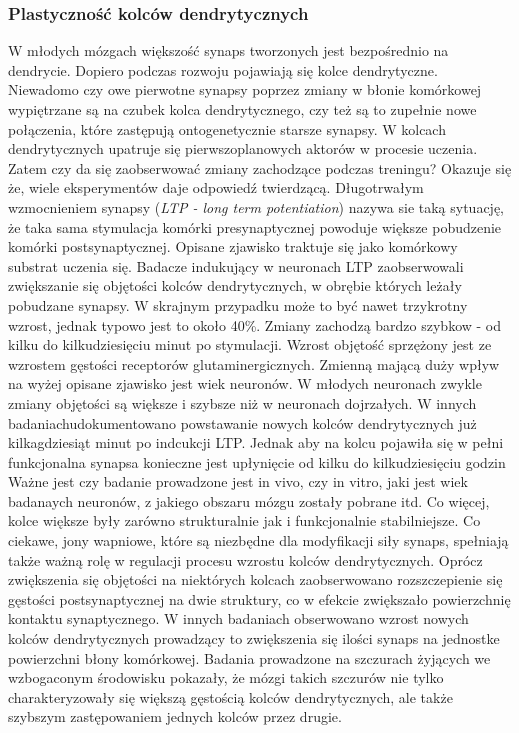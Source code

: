 \documentclass{article}
\begin{document}
\subsubsection{Plastyczność kolców dendrytycznych}
W młodych mózgach większość synaps tworzonych jest bezpośrednio na dendrycie.
Dopiero podczas rozwoju pojawiają się kolce dendrytyczne.
Niewadomo czy owe pierwotne synapsy poprzez zmiany w błonie komórkowej wypiętrzane są na czubek kolca dendrytycznego, czy też są to zupełnie nowe połączenia, które zastępują ontogenetycznie starsze synapsy.
W kolcach dendrytycznych upatruje się pierwszoplanowych aktorów w procesie uczenia.
Zatem czy da się zaobserwować zmiany zachodzące podczas treningu?
Okazuje się że, wiele eksperymentów daje odpowiedź twierdzącą.
Długotrwałym wzmocnieniem synapsy (\emph{LTP - long term potentiation}) nazywa sie taką sytuację, że taka sama stymulacja komórki presynaptycznej powoduje większe pobudzenie komórki postsynaptycznej.
Opisane zjawisko traktuje się jako komórkowy substrat uczenia się.
Badacze indukujący w neuronach LTP zaobserwowali zwiększanie się objętości kolców dendrytycznych, w obrębie których leżały pobudzane synapsy.
W skrajnym przypadku może to być nawet trzykrotny wzrost, jednak typowo jest to około 40\%.
Zmiany zachodzą bardzo szybkow - od kilku do kilkudziesięciu minut po stymulacji. 
Wzrost objętość sprzężony jest ze wzrostem gęstości receptorów glutaminergicznych.
Zmienną mającą duży wpływ na wyżej opisane zjawisko jest wiek neuronów.
W młodych neuronach zwykle zmiany objętości są większe i szybsze niż w neuronach dojrzałych.
W innych badaniachudokumentowano powstawanie nowych kolców dendrytycznych już kilkagdziesiąt minut po indcukcji LTP.
Jednak aby na kolcu pojawiła się w pełni funkcjonalna synapsa konieczne jest upłynięcie od kilku do kilkudziesięciu godzin\cite{Sala2014}
Ważne jest czy badanie prowadzone jest in vivo, czy in vitro, jaki jest wiek badanaych neuronów, z jakiego obszaru mózgu zostały pobrane itd.
Co więcej, kolce większe były zarówno strukturalnie jak i funkcjonalnie stabilniejsze.
Co ciekawe, jony wapniowe, które są niezbędne dla modyfikacji siły synaps, spełniają także ważną rolę w regulacji procesu wzrostu kolców dendrytycznych.
Oprócz zwiększenia się objętości na niektórych kolcach zaobserwowano rozszczepienie się gęstości postsynaptycznej na dwie struktury, co w efekcie zwiększało powierzchnię kontaktu synaptycznego.
W innych badaniach obserwowano wzrost nowych kolców dendrytycznych prowadzący to zwiększenia się ilości synaps na jednostke powierzchni błony komórkowej.
Badania prowadzone na szczurach żyjących we wzbogaconym środowisku pokazały, że mózgi takich szczurów nie tylko charakteryzowały się większą gęstością kolców dendrytycznych, ale także szybszym zastępowaniem jednych kolców przez drugie.
\end{document}
